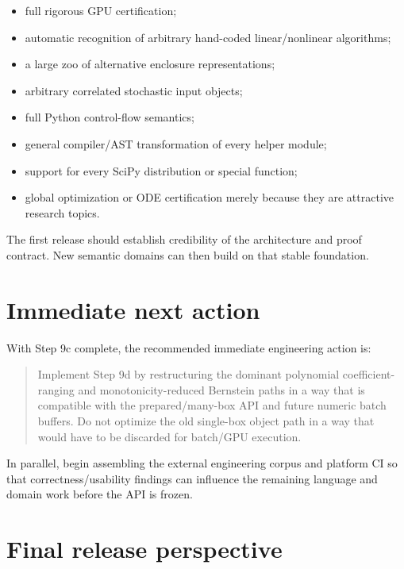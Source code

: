 \documentclass[11pt]{article}
\begin{document}
\begin{itemize}[leftmargin=*]
\item full rigorous GPU certification;
\item automatic recognition of arbitrary hand-coded linear/nonlinear algorithms;
\item a large zoo of alternative enclosure representations;
\item arbitrary correlated stochastic input objects;
\item full Python control-flow semantics;
\item general compiler/AST transformation of every helper module;
\item support for every SciPy distribution or special function;
\item global optimization or ODE certification merely because they are attractive
research topics.
\end{itemize}

The first release should establish credibility of the architecture and proof
contract.  New semantic domains can then build on that stable foundation.

\section{Immediate next action}

With Step 9c complete, the recommended immediate engineering action is:

\begin{quote}
Implement Step 9d by restructuring the dominant polynomial coefficient-ranging
and monotonicity-reduced Bernstein paths in a way that is compatible with the
prepared/many-box API and future numeric batch buffers.  Do not optimize the old
single-box object path in a way that would have to be discarded for batch/GPU
execution.
\end{quote}

In parallel, begin assembling the external engineering corpus and platform CI so
that correctness/usability findings can influence the remaining language and
domain work before the API is frozen.

\section{Final release perspective}
\end{document}
